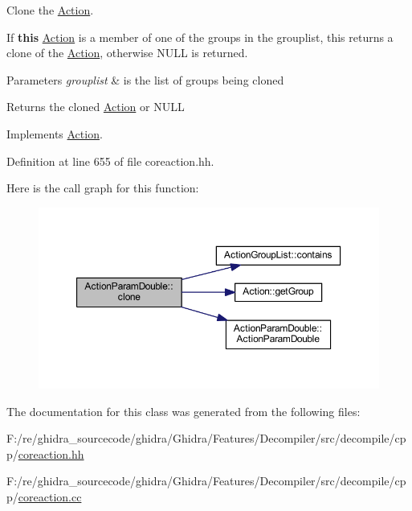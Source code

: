 Clone the \mbox{\hyperlink{class_action}{Action}}. 

If {\bfseries{this}} \mbox{\hyperlink{class_action}{Action}} is a member of one of the groups in the grouplist, this returns a clone of the \mbox{\hyperlink{class_action}{Action}}, otherwise N\+U\+LL is returned. 
\begin{DoxyParams}{Parameters}
{\em grouplist} & is the list of groups being cloned \\
\hline
\end{DoxyParams}
\begin{DoxyReturn}{Returns}
the cloned \mbox{\hyperlink{class_action}{Action}} or N\+U\+LL 
\end{DoxyReturn}


Implements \mbox{\hyperlink{class_action_af8242e41d09e5df52f97df9e65cc626f}{Action}}.



Definition at line 655 of file coreaction.\+hh.

Here is the call graph for this function\+:
\nopagebreak
\begin{figure}[H]
\begin{center}
\leavevmode
\includegraphics[width=350pt]{class_action_param_double_a0db428f4c947a73829164f43f4321d78_cgraph}
\end{center}
\end{figure}


The documentation for this class was generated from the following files\+:\begin{DoxyCompactItemize}
\item 
F\+:/re/ghidra\+\_\+sourcecode/ghidra/\+Ghidra/\+Features/\+Decompiler/src/decompile/cpp/\mbox{\hyperlink{coreaction_8hh}{coreaction.\+hh}}\item 
F\+:/re/ghidra\+\_\+sourcecode/ghidra/\+Ghidra/\+Features/\+Decompiler/src/decompile/cpp/\mbox{\hyperlink{coreaction_8cc}{coreaction.\+cc}}\end{DoxyCompactItemize}
